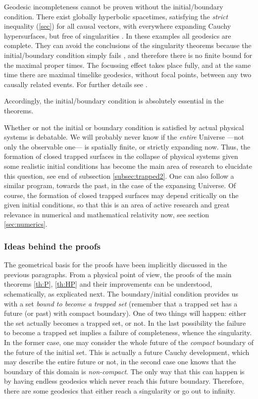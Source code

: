 \documentclass[12pt]{iopart}
\begin{document}
Geodesic incompleteness cannot be proven without the initial/boundary condition. There exist globally hyperbolic spacetimes, satisfying the {\it strict} inequality (\ref{sec}) for all causal vectors, with everywhere expanding Cauchy hypersurfaces, but free of singularities \cite{S,M}. In these examples all geodesics are complete. They can avoid the conclusions of the singularity theorems because the initial/boundary condition simply fails \cite{CFS}, and therefore there is no finite bound for the maximal proper times. The focussing effect takes place fully, and at the same time there are maximal timelike geodesics, without focal points, between any two causally related events. For further details see \cite{S1,SRay}. 

Accordingly, the initial/boundary condition is absolutely essential in the theorems.

Whether or not the initial or boundary condition is satisfied by actual physical systems is debatable. 
We will probably never know if the {\em entire} Universe ---not only the observable one--- is 
spatially finite, or strictly expanding now. Thus, the formation of closed trapped surfaces in the collapse of physical systems given some realistic initial conditions has become the main area of research to elucidate this question, see end of subsection \ref{subsec:trapped2}. One can also follow a similar program, towards the past, in the case of the expansing Universe. Of course, the formation of closed trapped surfaces may depend critically on the given initial conditions, so that this is an area of active research and great relevance in numerical and mathematical relativity now, see section \ref{sec:numerics}.



\subsubsection{Ideas behind the proofs}
The geometrical basis for the proofs have been implicitly discussed in the previous paragraphs.
From a physical point of view, the proofs of the main theorems \ref{th:P}, \ref{th:HP} and their improvements can be understood, schematically, as explicated next. The boundary/initial condition
provides us with a set {\it bound to become a trapped set} (remember that a trapped set has a future (or past) with compact boundary). One of two things will happen: either the set actually becomes a trapped set, or not. In the last possibility the failure to become a trapped set implies a failure of completeness, whence
the singularity. In the former case, one may consider the whole future of the {\em compact} boundary of the future of the initial set. This is actually a future Cauchy development, which may describe the entire future or not, in the second case one knows that the boundary of this domain is {\em non-compact}. The only way that this can happen is by having endless geodesics which never reach this future boundary. Therefore, there are some geodesics that either reach a singularity or go out to infinity. 
\end{document}

